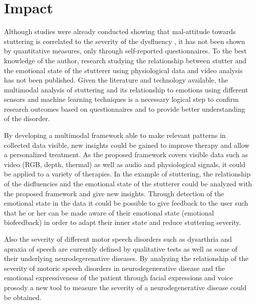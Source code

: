 


\section{Impact}

Although studies were already conducted showing that mal-attitude towards stuttering is correlated to the severity of the dysfluency \cite{Vanryckeghem2001}, it has not been shown by quantitative measures, only through self-reported questionnaires. To the best knowledge of the author, research studying the relationship between stutter and the emotional state of the stutterer using physiological data and video analysis has not been published. Given the literature and technology available, the multimodal analysis of stuttering and its relationship to emotions using different sensors and machine learning techniques is a necessary logical step to confirm research outcomes based on questionnaires and to provide better understanding of the disorder. 

By developing a multimodal framework able to make relevant patterns in collected data visible, new insights could be gained to improve therapy and allow a personalized treatment. As the proposed framework covers visible data such as video (RGB, depth, thermal) as well as audio and physiological signals, it could be applied to a variety of therapies. In the example of stuttering, the relationship of the disfluencies and the emotional state of the stutterer could be analyzed with the proposed framework and give new insights. Through detection of the emotional state in the data it could be possible to give feedback to the user such that he or her can be made aware of their emotional state (emotional biofeedback) in order to adapt their inner state and reduce stuttering severity. \par


Also the severity of different motor speech disorders such as dysarthria and apraxia of speech are currently defined by qualitative tests as well as some of their underlying neurodegerenative diseases. By analyzing the relationship of the severity of motoric speech disorders in neurodegenerative disease and the emotional expressiveness of the patient through facial expressions and voice prosody a new tool to measure the severity of a neurodegenerative disease could be obtained.


